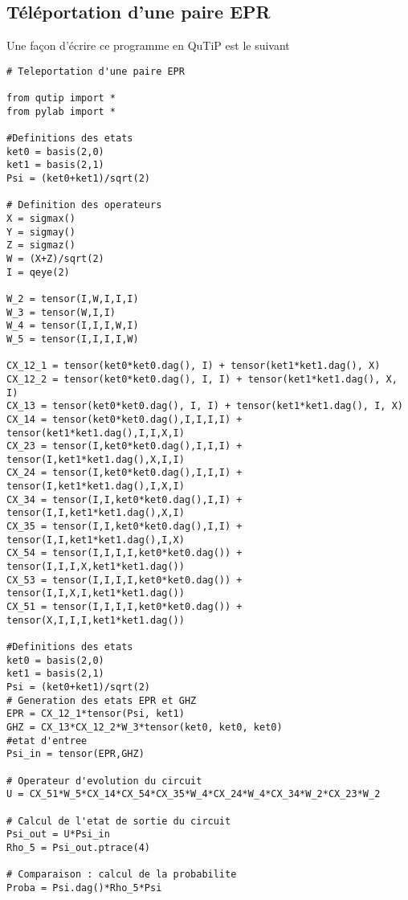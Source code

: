 \documentclass[a4paper,12pt]{book}
\numberwithin{equation}{section}
\begin{document}
\subsection{Téléportation d'une paire EPR}
Une façon d'écrire ce programme en QuTiP est le suivant
\begin{lstlisting}
# Teleportation d'une paire EPR

from qutip import *
from pylab import *

#Definitions des etats
ket0 = basis(2,0)
ket1 = basis(2,1)
Psi = (ket0+ket1)/sqrt(2)

# Definition des operateurs
X = sigmax()
Y = sigmay()
Z = sigmaz()
W = (X+Z)/sqrt(2)
I = qeye(2)

W_2 = tensor(I,W,I,I,I)
W_3 = tensor(W,I,I)
W_4 = tensor(I,I,I,W,I)
W_5 = tensor(I,I,I,I,W)

CX_12_1 = tensor(ket0*ket0.dag(), I) + tensor(ket1*ket1.dag(), X)
CX_12_2 = tensor(ket0*ket0.dag(), I, I) + tensor(ket1*ket1.dag(), X, I)
CX_13 = tensor(ket0*ket0.dag(), I, I) + tensor(ket1*ket1.dag(), I, X)
CX_14 = tensor(ket0*ket0.dag(),I,I,I,I) + tensor(ket1*ket1.dag(),I,I,X,I)
CX_23 = tensor(I,ket0*ket0.dag(),I,I,I) + tensor(I,ket1*ket1.dag(),X,I,I)
CX_24 = tensor(I,ket0*ket0.dag(),I,I,I) + tensor(I,ket1*ket1.dag(),I,X,I)
CX_34 = tensor(I,I,ket0*ket0.dag(),I,I) + tensor(I,I,ket1*ket1.dag(),X,I)
CX_35 = tensor(I,I,ket0*ket0.dag(),I,I) + tensor(I,I,ket1*ket1.dag(),I,X)
CX_54 = tensor(I,I,I,I,ket0*ket0.dag()) + tensor(I,I,I,X,ket1*ket1.dag())
CX_53 = tensor(I,I,I,I,ket0*ket0.dag()) + tensor(I,I,X,I,ket1*ket1.dag())
CX_51 = tensor(I,I,I,I,ket0*ket0.dag()) + tensor(X,I,I,I,ket1*ket1.dag())

#Definitions des etats
ket0 = basis(2,0)
ket1 = basis(2,1)
Psi = (ket0+ket1)/sqrt(2)
# Generation des etats EPR et GHZ
EPR = CX_12_1*tensor(Psi, ket1)
GHZ = CX_13*CX_12_2*W_3*tensor(ket0, ket0, ket0)
#etat d'entree
Psi_in = tensor(EPR,GHZ)

# Operateur d'evolution du circuit
U = CX_51*W_5*CX_14*CX_54*CX_35*W_4*CX_24*W_4*CX_34*W_2*CX_23*W_2

# Calcul de l'etat de sortie du circuit
Psi_out = U*Psi_in
Rho_5 = Psi_out.ptrace(4)

# Comparaison : calcul de la probabilite
Proba = Psi.dag()*Rho_5*Psi
\end{lstlisting}
\end{document}
